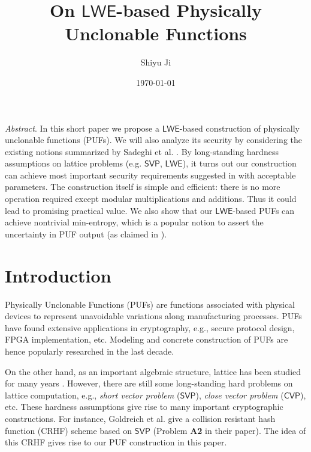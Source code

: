 \documentclass[12pt]{article}
\newcommand{\SVP}{\mathsf{SVP}}
\newcommand{\CVP}{\mathsf{CVP}}
\newcommand{\LWE}{\mathsf{LWE}}
\theoremstyle{definition}
\begin{document}
\title{On $\LWE$-based Physically Unclonable Functions}
\author{Shiyu Ji}
\date{\today}
\maketitle

{\it Abstract}. 
In this short paper we propose a $\LWE$-based construction of physically unclonable functions (PUFs). We will also analyze its security by considering the existing notions summarized by Sadeghi et al. \cite{sadeghi2016towards}. By long-standing hardness assumptions on lattice problems (e.g. $\SVP$, $\LWE$), it turns out our construction can achieve most important security requirements suggested in \cite{sadeghi2016towards} with acceptable parameters. The construction itself is simple and efficient: there is no more operation required except modular multiplications and additions. Thus it could lead to promising practical value. We also show that our $\LWE$-based PUFs can achieve nontrivial min-entropy, which is a popular notion to assert the uncertainty in PUF output (as claimed in \cite{sadeghi2016towards}). 

\section{Introduction}
Physically Unclonable Functions (PUFs) are functions associated with physical devices to represent unavoidable variations along manufacturing processes. PUFs have found extensive applications in cryptography, e.g., secure protocol design, FPGA implementation, etc. \cite{sadeghi2016towards} Modeling and concrete construction of PUFs are hence popularly researched in the last decade.

On the other hand, as an important algebraic structure, lattice has been studied for many years \cite{regev2009lattices}. However, there are still some long-standing hard problems on lattice computation, e.g., \emph{short vector problem} ($\SVP$), \emph{close vector problem} ($\CVP$), etc. These hardness assumptions give rise to many important cryptographic constructions. For instance, Goldreich et al. \cite{goldreich2011collision} give a collision resistant hash function (CRHF) scheme based on $\SVP$ (Problem {\bf A2} in their paper). The idea of this CRHF gives rise to our PUF construction in this paper.
\end{document}
